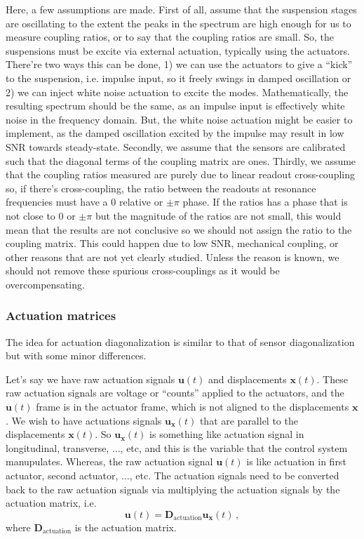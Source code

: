 Here, a few assumptions are made.
First of all, assume that the suspension stages are oscillating to the extent the peaks in the spectrum are high enough for us to measure coupling ratios, or to say that the coupling ratios are small.
So, the suspensions must be excite via external actuation, typically using the actuators.
There're two ways this can be done, 1) we can use the actuators to give a ``kick'' to the suspension, i.e. impulse input, so it freely swings in damped oscillation or 2) we can inject white noise actuation to excite the modes.
Mathematically, the resulting spectrum should be the same, as an impulse input is effectively white noise in the frequency domain.
But, the white noise actuation might be easier to implement, as the damped oscillation excited by the impulse may result in low SNR towards steady-state.
Secondly, we assume that the sensors are calibrated such that the diagonal terms of the coupling matrix are ones.
Thirdly, we assume that the coupling ratios measured are purely due to linear readout cross-coupling so, if there's cross-coupling, the ratio between the readouts at resonance frequencies must have a 0 relative or $\pm \pi$ phase.
If the ratios has a phase that is not close to 0 or $\pm \pi$ but the magnitude of the ratios are not small, this would mean that the results are not conclusive so we should not assign the ratio to the coupling matrix.
This could happen due to low SNR, mechanical coupling, or other reasons that are not yet clearly studied.
Unless the reason is known, we should not remove these spurious cross-couplings as it would be overcompensating.

\subsubsection{Actuation matrices \label{sec:control_matrices_actuation_matrices}}
The idea for actuation diagonalization is similar to that of sensor diagonalization but with some minor differences.

Let's say we have raw actuation signals $\mathbf{u}(t)$ and displacements $\mathbf{x}(t)$.
These raw actuation signals are voltage or ``counts'' applied to the actuators, and the $\mathbf{u}(t)$ frame is in the actuator frame, which is not aligned to the displacements $\mathbf{x}$.
We wish to have actuations signals $\mathbf{u}_\mathbf{x}(t)$ that are parallel to the displacements $\mathbf{x}(t)$.
So $\mathbf{u}_\mathbf{x}(t)$ is something like actuation signal in longitudinal, transverse, ..., etc, and this is the variable that the control system manupulates.
Whereas, the raw actuation signal $\mathbf{u}(t)$ is like actuation in first actuator, second actuator, ..., etc.
The actuation signals need to be converted back to the raw actuation signals via multiplying the actuation signals by the actuation matrix, i.e.
\begin{equation}
	\mathbf{u}(t)=\mathbf{D}_\mathrm{actuation}\mathbf{u}_\mathbf{x}(t)\,,
\end{equation}
where $\mathbf{D}_\mathrm{actuation}$ is the actuation matrix.

